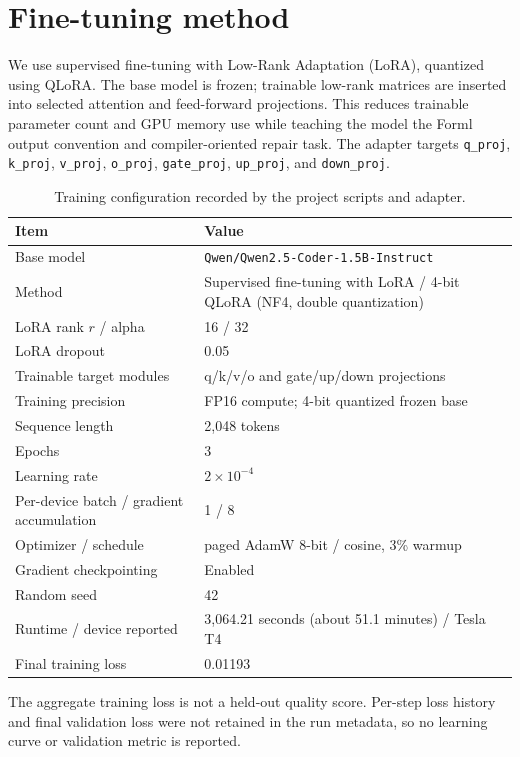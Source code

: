 \documentclass[11pt,a4paper]{article}
\begin{document}
\section{Fine-tuning method}
We use supervised fine-tuning with Low-Rank Adaptation (LoRA), quantized using QLoRA. The base model is frozen; trainable low-rank matrices are inserted into selected attention and feed-forward projections. This reduces trainable parameter count and GPU memory use while teaching the model the Forml output convention and compiler-oriented repair task. The adapter targets \texttt{q\_proj}, \texttt{k\_proj}, \texttt{v\_proj}, \texttt{o\_proj}, \texttt{gate\_proj}, \texttt{up\_proj}, and \texttt{down\_proj}.

\begin{table}[H]
\centering
\caption{Training configuration recorded by the project scripts and adapter.}
\begin{tabularx}{\linewidth}{lX}
\toprule
Item & Value \\
\midrule
Base model & \texttt{Qwen/Qwen2.5-Coder-1.5B-Instruct} \\
Method & Supervised fine-tuning with LoRA / 4-bit QLoRA (NF4, double quantization) \\
LoRA rank $r$ / alpha & 16 / 32 \\
LoRA dropout & 0.05 \\
Trainable target modules & q/k/v/o and gate/up/down projections \\
Training precision & FP16 compute; 4-bit quantized frozen base \\
Sequence length & 2,048 tokens \\
Epochs & 3 \\
Learning rate & $2\times10^{-4}$ \\
Per-device batch / gradient accumulation & 1 / 8 \\
Optimizer / schedule & paged AdamW 8-bit / cosine, 3\% warmup \\
Gradient checkpointing & Enabled \\
Random seed & 42 \\
Runtime / device reported & 3,064.21 seconds (about 51.1 minutes) / Tesla T4 \\
Final training loss & 0.01193 \\
\bottomrule
\end{tabularx}
\end{table}

The aggregate training loss is not a held-out quality score. Per-step loss history and final validation loss were not retained in the run metadata, so no learning curve or validation metric is reported.
\end{document}
